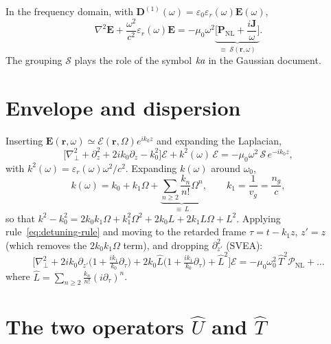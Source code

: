 \documentclass[11pt,a4paper]{article}
\begin{document}
In the frequency domain, with
$\mathbf{D}^{(1)}(\omega)=\varepsilon_0\varepsilon_r(\omega)\mathbf{E}(\omega)$,
\begin{equation}
\nabla^2\mathbf{E}+\frac{\omega^2}{c^2}\varepsilon_r(\omega)\mathbf{E}
 = -\mu_0\omega^2\underbrace{\Big[\mathbf{P}_{\text{NL}}
    + \frac{i\mathbf{J}}{\omega}\Big]}_{\displaystyle \equiv\;\mathcal{S}(\mathbf{r},\omega)} .
\end{equation}
The grouping $\mathcal{S}$ plays the role of the symbol $\text{\it ka}$ in the
Gaussian document.

\section{Envelope and dispersion}

Inserting $\mathbf{E}(\mathbf{r},\omega)\simeq
\mathcal{E}(\mathbf{r},\Omega)e^{ik_0z}$ and expanding the Laplacian,
\begin{equation*}
\Big[\nabla_\perp^2+\partial_z^2+2ik_0\partial_z-k_0^2\Big]\mathcal{E}
 + k^2(\omega)\,\mathcal{E} = -\mu_0\omega^2\,\mathcal{S}\,e^{-ik_0z},
\end{equation*}
with $k^2(\omega)=\varepsilon_r(\omega)\omega^2/c^2$. Expanding $k(\omega)$
around $\omega_0$,
\begin{equation}
k(\omega)=k_0+k_1\Omega+\underbrace{\sum_{n\ge 2}\frac{k_n}{n!}\Omega^n}_{\displaystyle \equiv\, L},
\qquad k_1=\frac{1}{v_g}=\frac{n_g}{c},
\end{equation}
so that $k^2-k_0^2 = 2k_0k_1\Omega + k_1^2\Omega^2 + 2k_0L + 2k_1 L\Omega + L^2$.
Applying rule~\eqref{eq:detuning-rule} and moving to the retarded frame
$\tau=t-k_1z$, $z'=z$ (which removes the $2k_0k_1\Omega$ term), and dropping
$\partial_{z'}^2$ (SVEA):
\begin{equation}
\label{eq:pre-U}
\Big[\nabla_\perp^2
 + 2ik_0\partial_{z'}\big(1+\tfrac{ik_1}{k_0}\partial_\tau\big)
 + 2k_0\hat{L}\big(1+\tfrac{ik_1}{k_0}\partial_\tau\big)
 + \hat{L}^2\Big]\mathcal{E}
 = -\mu_0\omega_0^2\,\hat{T}^2\mathcal{P}_{\text{NL}} + \dots
\end{equation}
where $\hat L=\sum_{n\ge2}\frac{k_n}{n!}(i\partial_\tau)^n$.

\section{The two operators \texorpdfstring{$\hat U$}{U} and \texorpdfstring{$\hat T$}{T}}
\label{sec:operators}
\end{document}
